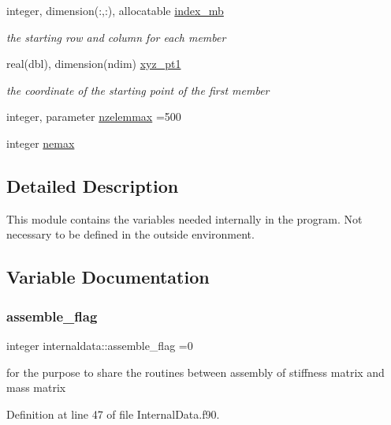 \begin{DoxyCompactItemize}
integer, dimension(\+:,\+:), allocatable \hyperlink{namespaceinternaldata_ac5f95d07b735be7220fcf6814e1ab4a8}{index\+\_\+mb}
\begin{DoxyCompactList}\small\item\em the starting row and column for each member \end{DoxyCompactList}\item 
real(dbl), dimension(ndim) \hyperlink{namespaceinternaldata_a9ea25e6f8fbdc09124cc1002446ffcfc}{xyz\+\_\+pt1}
\begin{DoxyCompactList}\small\item\em the coordinate of the starting point of the first member \end{DoxyCompactList}\item 
integer, parameter \hyperlink{namespaceinternaldata_ac1eede24bc6cba1bdab331c6ad695fcc}{nzelemmax} =500
\item 
integer \hyperlink{namespaceinternaldata_a9f8cf693f79f58344704c979aa5168c4}{nemax}
\end{DoxyCompactItemize}


\subsection{Detailed Description}
This module contains the variables needed internally in the program. Not necessary to be defined in the outside environment. 

\subsection{Variable Documentation}
\mbox{\label{namespaceinternaldata_ae1ae8091a874c45a6efe110578e140bc}} 
\subsubsection{\texorpdfstring{assemble\+\_\+flag}{assemble\_flag}}
{\footnotesize\ttfamily integer internaldata\+::assemble\+\_\+flag =0}



for the purpose to share the routines between assembly of stiffness matrix and mass matrix 



Definition at line 47 of file Internal\+Data.\+f90.

